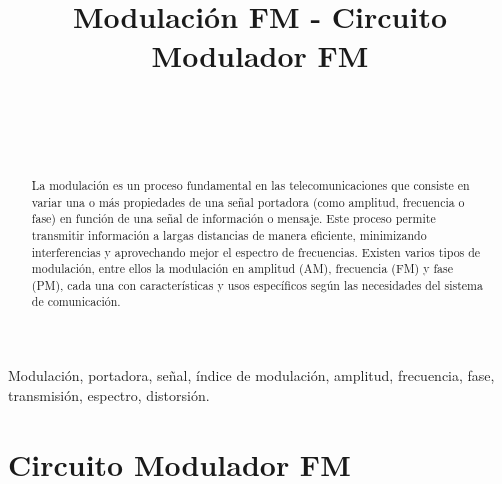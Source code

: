 \documentclass[conference]{IEEEtran}
\begin{document}
	
	\title{Modulación FM - Circuito Modulador FM}
	\author{
		\\
		\\
		\\
		\and
		\and
		\and
	}
	
	\maketitle
	\begin{abstract}
		La modulación es un proceso fundamental en las telecomunicaciones que consiste en variar una o más propiedades de una señal portadora (como amplitud, frecuencia o fase) en función de una señal de información o mensaje. Este proceso permite transmitir información a largas distancias de manera eficiente, minimizando interferencias y aprovechando mejor el espectro de frecuencias. Existen varios tipos de modulación, entre ellos la modulación en amplitud (AM), frecuencia (FM) y fase (PM), cada una con características y usos específicos según las necesidades del sistema de comunicación.
		
	\end{abstract}
	
	\begin{IEEEkeywords}
		Modulación, portadora, señal, índice de modulación, amplitud, frecuencia, fase, transmisión, espectro, distorsión.
	\end{IEEEkeywords}
	
	\section{Circuito Modulador FM}
	
\end{document}
